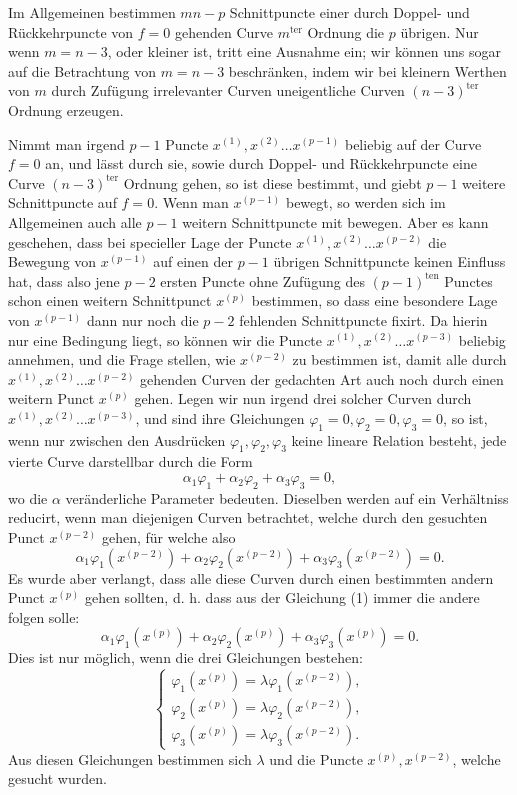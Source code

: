 \documentclass[10pt]{article}
\begin{document}
Im Allgemeinen bestimmen \(mn-p\) Schnittpuncte einer durch Doppel- und Rückkehrpuncte von \(f=0\) gehenden Curve \(m^{\mathrm{ter}}\) Ordnung die \(p\) übrigen. Nur wenn \(m=n-3\), oder kleiner ist, tritt eine Ausnahme ein; wir können uns sogar auf die Betrachtung von \(m=n-3\) beschränken, indem wir bei kleinern Werthen von \(m\) durch Zufügung irrelevanter Curven uneigentliche Curven \((n-3)^{\mathrm{ter}}\) Ordnung erzeugen.

Nimmt man irgend \(p-1\) Puncte \(x^{(1)},x^{(2)}\ldots x^{(p-1)}\) beliebig auf der Curve \(f=0\) an, und lässt durch sie, sowie durch Doppel- und Rückkehrpuncte eine Curve \((n-3)^{\mathrm{ter}}\) Ordnung gehen, so ist diese bestimmt, und giebt \(p-1\) weitere Schnittpuncte auf \(f=0\). Wenn man \(x^{(p-1)}\) bewegt, so werden sich im Allgemeinen auch alle \(p-1\) weitern Schnittpuncte mit bewegen. Aber es kann geschehen, dass bei specieller Lage der Puncte \(x^{(1)},x^{(2)}\ldots x^{(p-2)}\) die Bewegung von \(x^{(p-1)}\) auf einen der \(p-1\) übrigen Schnittpuncte keinen Einfluss hat, dass also jene \(p-2\) ersten Puncte ohne Zufügung des \((p-1)^{\mathrm{ten}}\) Punctes schon einen weitern Schnittpunct \(x^{(p)}\) bestimmen, so dass eine besondere Lage von \(x^{(p-1)}\) dann nur noch die \(p-2\) fehlenden Schnittpuncte fixirt. Da hierin nur eine Bedingung liegt, so können wir die Puncte \(x^{(1)},x^{(2)}\ldots x^{(p-3)}\) beliebig annehmen, und die Frage stellen, wie \(x^{(p-2)}\) zu bestimmen ist, damit alle durch \(x^{(1)},x^{(2)}\ldots x^{(p-2)}\) gehenden Curven der gedachten Art auch noch durch einen weitern Punct \(x^{(p)}\) gehen. Legen wir nun irgend drei solcher Curven durch \(x^{(1)},x^{(2)}\ldots x^{(p-3)}\), und sind ihre Gleichungen \(\varphi_1=0,\varphi_2=0,\varphi_3=0\), so ist, wenn nur zwischen den Ausdrücken \(\varphi_1,\varphi_2,\varphi_3\) keine lineare Relation besteht, jede vierte Curve darstellbar durch die Form
\[
\alpha_1\varphi_1+\alpha_2\varphi_2+\alpha_3\varphi_3=0,
\]
wo die \(\alpha\) veränderliche Parameter bedeuten. Dieselben werden auf ein Verhältniss reducirt, wenn man diejenigen Curven betrachtet, welche durch den gesuchten Punct \(x^{(p-2)}\) gehen, für welche also
\[
\tag{1}
\alpha_1\varphi_1(x^{(p-2)})+\alpha_2\varphi_2(x^{(p-2)})+\alpha_3\varphi_3(x^{(p-2)})=0.
\]
Es wurde aber verlangt, dass alle diese Curven durch einen bestimmten andern Punct \(x^{(p)}\) gehen sollten, d. h. dass aus der Gleichung (1) immer die andere folgen solle:
\[
\tag{2}
\alpha_1\varphi_1(x^{(p)})+\alpha_2\varphi_2(x^{(p)})+\alpha_3\varphi_3(x^{(p)})=0.
\]
Dies ist nur möglich, wenn die drei Gleichungen bestehen:
\[
\tag{3}
\begin{cases}
\varphi_1(x^{(p)})=\lambda\varphi_1(x^{(p-2)}),\\
\varphi_2(x^{(p)})=\lambda\varphi_2(x^{(p-2)}),\\
\varphi_3(x^{(p)})=\lambda\varphi_3(x^{(p-2)}).
\end{cases}
\]
Aus diesen Gleichungen bestimmen sich \(\lambda\) und die Puncte \(x^{(p)},x^{(p-2)}\), welche gesucht wurden.
\end{document}
